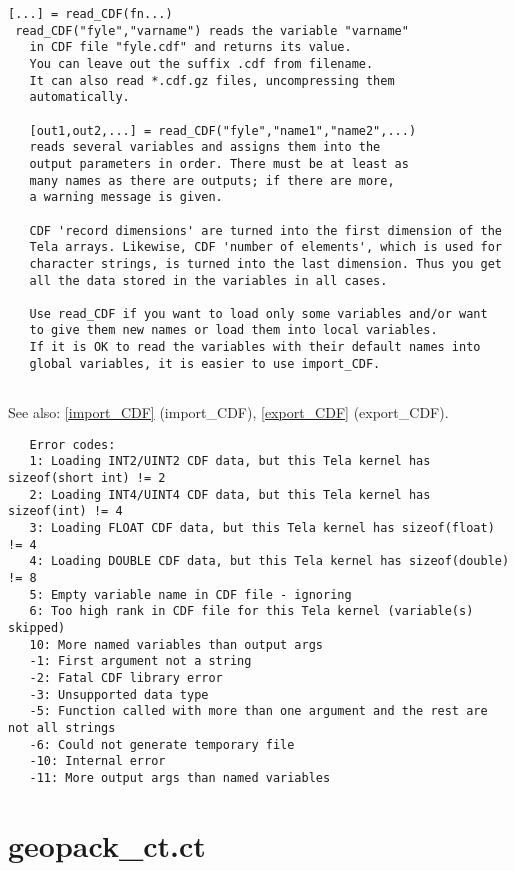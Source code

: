\documentclass[a4paper]{article}
\begin{document}
\begin{tscreen}
\begin{verbatim}
[...] = read_CDF(fn...)
 read_CDF("fyle","varname") reads the variable "varname"
   in CDF file "fyle.cdf" and returns its value.
   You can leave out the suffix .cdf from filename.
   It can also read *.cdf.gz files, uncompressing them
   automatically.

   [out1,out2,...] = read_CDF("fyle","name1","name2",...)
   reads several variables and assigns them into the
   output parameters in order. There must be at least as
   many names as there are outputs; if there are more,
   a warning message is given.

   CDF 'record dimensions' are turned into the first dimension of the
   Tela arrays. Likewise, CDF 'number of elements', which is used for
   character strings, is turned into the last dimension. Thus you get
   all the data stored in the variables in all cases.

   Use read_CDF if you want to load only some variables and/or want
   to give them new names or load them into local variables.
   If it is OK to read the variables with their default names into
   global variables, it is easier to use import_CDF.
   
\end{verbatim}

See also: \ref{import_CDF} {(import\_CDF)}, \ref{export_CDF} {(export\_CDF)}.
\begin{verbatim}
   Error codes:
   1: Loading INT2/UINT2 CDF data, but this Tela kernel has sizeof(short int) != 2
   2: Loading INT4/UINT4 CDF data, but this Tela kernel has sizeof(int) != 4
   3: Loading FLOAT CDF data, but this Tela kernel has sizeof(float) != 4
   4: Loading DOUBLE CDF data, but this Tela kernel has sizeof(double) != 8
   5: Empty variable name in CDF file - ignoring
   6: Too high rank in CDF file for this Tela kernel (variable(s) skipped)
   10: More named variables than output args
   -1: First argument not a string
   -2: Fatal CDF library error
   -3: Unsupported data type
   -5: Function called with more than one argument and the rest are not all strings
   -6: Could not generate temporary file
   -10: Internal error
   -11: More output args than named variables
\end{verbatim}
\end{tscreen}





\section{geopack\_ct.ct}
\end{document}
